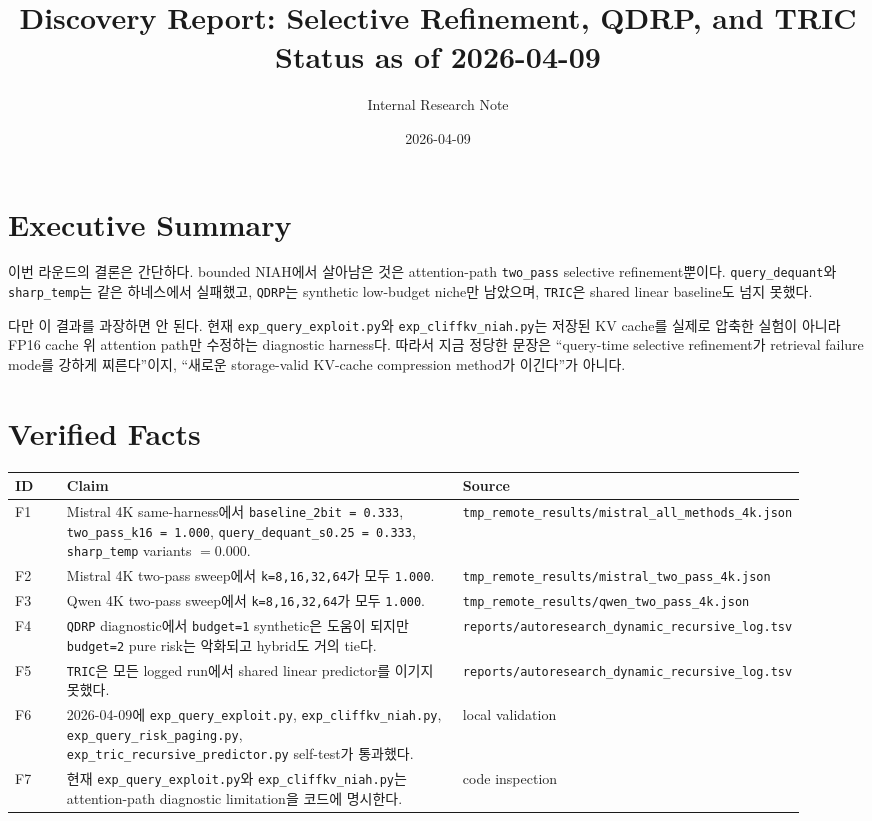 \documentclass[11pt]{article}
\title{Discovery Report: Selective Refinement, QDRP, and TRIC\\Status as of 2026-04-09}
\author{Internal Research Note}
\date{2026-04-09}
\begin{document}
\maketitle

\section*{Executive Summary}

이번 라운드의 결론은 간단하다. bounded NIAH에서 살아남은 것은 attention-path \texttt{two\_pass} selective refinement뿐이다. \texttt{query\_dequant}와 \texttt{sharp\_temp}는 같은 하네스에서 실패했고, \texttt{QDRP}는 synthetic low-budget niche만 남았으며, \texttt{TRIC}은 shared linear baseline도 넘지 못했다.

다만 이 결과를 과장하면 안 된다. 현재 \texttt{exp\_query\_exploit.py}와 \texttt{exp\_cliffkv\_niah.py}는 저장된 KV cache를 실제로 압축한 실험이 아니라 FP16 cache 위 attention path만 수정하는 diagnostic harness다. 따라서 지금 정당한 문장은 ``query-time selective refinement가 retrieval failure mode를 강하게 찌른다''이지, ``새로운 storage-valid KV-cache compression method가 이긴다''가 아니다.

\section*{Verified Facts}

\begin{longtable}{@{}p{0.08\linewidth}p{0.62\linewidth}p{0.22\linewidth}@{}}
\toprule
ID & Claim & Source \\
\midrule
\endhead
F1 & Mistral 4K same-harness에서 \texttt{baseline\_2bit = 0.333}, \texttt{two\_pass\_k16 = 1.000}, \texttt{query\_dequant\_s0.25 = 0.333}, \texttt{sharp\_temp} variants $= 0.000$. & \texttt{tmp\_remote\_results/mistral\_all\_methods\_4k.json} \\
F2 & Mistral 4K two-pass sweep에서 \texttt{k=8,16,32,64}가 모두 \texttt{1.000}. & \texttt{tmp\_remote\_results/mistral\_two\_pass\_4k.json} \\
F3 & Qwen 4K two-pass sweep에서 \texttt{k=8,16,32,64}가 모두 \texttt{1.000}. & \texttt{tmp\_remote\_results/qwen\_two\_pass\_4k.json} \\
F4 & \texttt{QDRP} diagnostic에서 \texttt{budget=1} synthetic은 도움이 되지만 \texttt{budget=2} pure risk는 악화되고 hybrid도 거의 tie다. & \texttt{reports/autoresearch\_dynamic\_recursive\_log.tsv} \\
F5 & \texttt{TRIC}은 모든 logged run에서 shared linear predictor를 이기지 못했다. & \texttt{reports/autoresearch\_dynamic\_recursive\_log.tsv} \\
F6 & 2026-04-09에 \texttt{exp\_query\_exploit.py}, \texttt{exp\_cliffkv\_niah.py}, \texttt{exp\_query\_risk\_paging.py}, \texttt{exp\_tric\_recursive\_predictor.py} self-test가 통과했다. & local validation \\
F7 & 현재 \texttt{exp\_query\_exploit.py}와 \texttt{exp\_cliffkv\_niah.py}는 attention-path diagnostic limitation을 코드에 명시한다. & code inspection \\
\bottomrule
\end{longtable}
\end{document}
